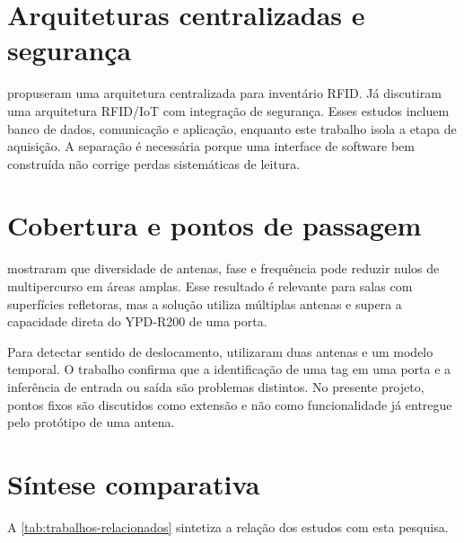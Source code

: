 \section{Arquiteturas centralizadas e segurança}

 propuseram uma arquitetura centralizada para inventário RFID. Já  discutiram uma arquitetura RFID/IoT com integração de segurança. Esses estudos incluem banco de dados, comunicação e aplicação, enquanto este trabalho isola a etapa de aquisição. A separação é necessária porque uma interface de software bem construída não corrige perdas sistemáticas de leitura.

\section{Cobertura e pontos de passagem}

 mostraram que diversidade de antenas, fase e frequência pode reduzir nulos de multipercurso em áreas amplas. Esse resultado é relevante para salas com superfícies refletoras, mas a solução utiliza múltiplas antenas e supera a capacidade direta do YPD-R200 de uma porta.

Para detectar sentido de deslocamento,  utilizaram duas antenas e um modelo temporal. O trabalho confirma que a identificação de uma tag em uma porta e a inferência de entrada ou saída são problemas distintos. No presente projeto, pontos fixos são discutidos como extensão e não como funcionalidade já entregue pelo protótipo de uma antena.

\section{Síntese comparativa}

A \autoref{tab:trabalhos-relacionados} sintetiza a relação dos estudos com esta pesquisa.

